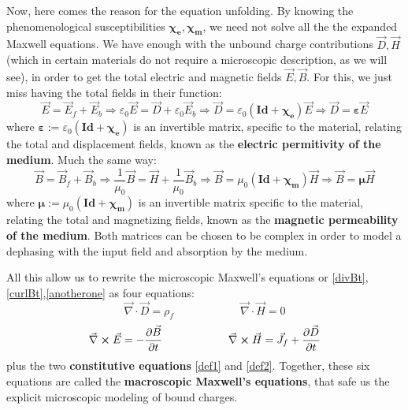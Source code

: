 \documentclass[11pt, a4paper, twoside]{article} %
\begin{document}
Now, here comes the reason for the equation unfolding. By knowing the phenomenological susceptibilities $\pmb{\chi_e},\pmb{\chi_m}$, we need not solve all the the expanded Maxwell equations. We have enough with the unbound charge contributions $\vec{D},\vec{H}$ (which in certain materials do not require a microscopic description, as we will see), in order to get the total electric and magnetic fields $\vec{E},\vec{B}$. For this, we just miss having the total fields in their function:
\begin{equation}\label{def1}
\vec{E}=\vec{E}_f+\vec{E}_b \Longrightarrow \varepsilon_0\vec{E}=\vec{D}+\varepsilon_0\vec{E}_b\Longrightarrow \vec{D}=\varepsilon_0(\pmb{Id}+\pmb{\chi_e})\vec{E} \Longrightarrow \vec{D}=\pmb{\varepsilon}\vec{E}
\end{equation} 
where $\pmb{\varepsilon}:=\varepsilon_0(\pmb{Id}+\pmb{\chi_e})$ is an invertible matrix, specific to the material, relating the total and displacement fields, known as the {\bf electric permitivity of the medium}. Much the same way:
\begin{equation}\label{def2}
\vec{B}=\vec{B}_f+\vec{B}_b \Longrightarrow \frac{1}{\mu_0}\vec{B}=\vec{H}+\frac{1}{\mu_0}\vec{B}_b\Longrightarrow \vec{B}=\mu_0(\pmb{Id}+\pmb{\chi_m})\vec{H}\Longrightarrow \vec{B}=\pmb{\mu} \vec{H}
\end{equation} 
where $\pmb{\mu}:=\mu_0(\pmb{Id}+\pmb{\chi_m})$ is an invertible matrix specific to the material, relating the total and magnetizing fields, known as the {\bf magnetic permeability of the medium}. Both matrices can be chosen to be complex in order to model a dephasing with the input field and absorption by the medium.

\noindent All this allow us to rewrite the microscopic Maxwell's equations or {\small \eqref{divBt},\eqref{curlBt},\eqref{anotherone}} as four equations: 
\begin{equation}\label{div2}
\vec{\nabla}\cdot \vec{D}=\rho_f \quad \quad \quad \quad \quad \quad \vec{\nabla}\cdot \vec{H}=0
\end{equation}
\begin{equation}\label{curl2}
\vec{\nabla}\cross \vec{E}=-\pdv{\vec{B}}{t} \quad \quad \quad \quad \quad \quad \vec{\nabla}\cross \vec{H}=\vec{J}_f+\pdv{\vec{D}}{t}
\end{equation}
plus the two {\bf constitutive equations} \eqref{def1} and \eqref{def2}. Together, these six equations are called the {\bf macroscopic Maxwell's equations}, that safe us the explicit microscopic modeling of bound charges.
\end{document}
